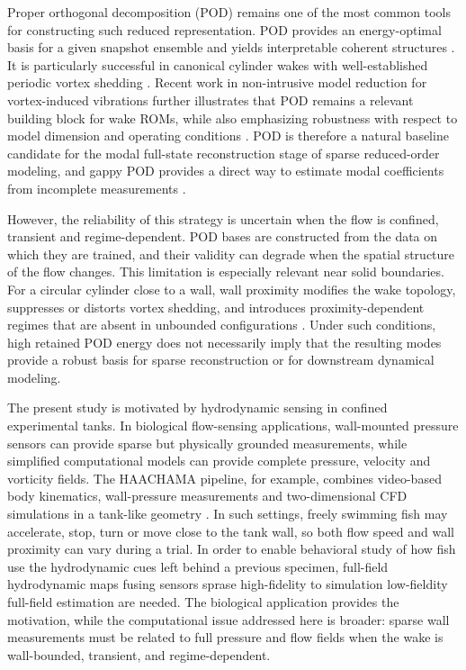 \documentclass[preprint,12pt]{elsarticle}
\begin{document}
Proper orthogonal decomposition (POD) remains one of the most common tools for constructing such reduced representation. POD provides an energy-optimal basis for a given snapshot ensemble and yields interpretable coherent structures \citep{Berkooz1993,Chatterjee2000}. It is particularly successful in canonical cylinder wakes with well-established periodic vortex shedding \citep{Noack2003,Tadmor2010}. Recent work in non-intrusive model reduction for vortex-induced vibrations further illustrates that POD remains a relevant building block for wake ROMs, while also emphasizing robustness with respect to model dimension and operating conditions \citep{Gkimisis2024}. POD is therefore a natural baseline candidate for the modal full-state reconstruction stage of sparse reduced-order modeling, and gappy POD provides a direct way to estimate modal coefficients from incomplete measurements \citep{Willcox2006}.

However, the reliability of this strategy is uncertain when the flow is confined, transient and regime-dependent. POD bases are constructed from the data on which they are trained, and their validity can degrade when the spatial structure of the flow changes. This limitation is especially relevant near solid boundaries. For a circular cylinder close to a wall, wall proximity modifies the wake topology, suppresses or distorts vortex shedding, and introduces proximity-dependent regimes that are absent in unbounded configurations \citep{Price2002,Chakraborty2004,Rao2013}. Under such conditions, high retained POD energy does not necessarily imply that the resulting modes provide a robust basis for sparse reconstruction or for downstream dynamical modeling.

The present study is motivated by hydrodynamic sensing in confined experimental tanks. In biological flow-sensing applications, wall-mounted pressure sensors can provide sparse but physically grounded measurements, while simplified computational models can provide complete pressure, velocity and vorticity fields. The HAACHAMA pipeline, for example, combines video-based body kinematics, wall-pressure measurements and two-dimensional CFD simulations in a tank-like geometry \citep{Porcon2024,Lagneaux2025}. In such settings, freely swimming fish may accelerate, stop, turn or move close to the tank wall, so both flow speed and wall proximity can vary during a trial. In order to enable behavioral study of how fish use the hydrodynamic cues left behind a previous specimen, full-field hydrodynamic maps fusing sensors sprase high-fidelity to simulation low-fieldity full-field estimation are needed. The biological application provides the motivation, while the computational issue addressed here is broader: sparse wall measurements must be related to full pressure and flow fields when the wake is wall-bounded, transient, and regime-dependent.
\end{document}
